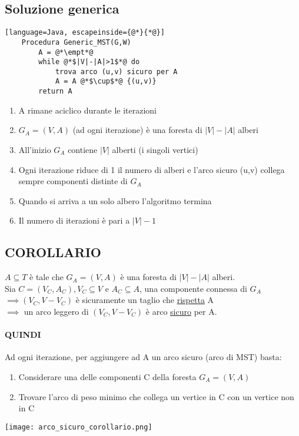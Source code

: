 \subsection{Soluzione generica}
\begin{lstlisting}[language=Java, escapeinside={@*}{*@}]
    Procedura Generic_MST(G,W)
        A = @*\empt*@
        while @*$|V|-|A|>1$*@ do
            trova arco (u,v) sicuro per A
            A = A @*$\cup$*@ {(u,v)}
        return A
\end{lstlisting}
\begin{enumerate}
    \item A rimane aciclico durante le iterazioni
    \item $G_A = (V,A)$ (ad ogni iterazione) è una foresta di $|V|-|A|$ alberi
    \item All'inizio $G_A$ contiene $|V|$ alberti (i singoli vertici)
    \item Ogni iterazione riduce di 1 il numero di alberi e l'arco sicuro (u,v) collega
    sempre componenti distinte di $G_A$
    \item Quando si arriva a un solo albero l'algoritmo termina
    \item Il numero di iterazioni è pari a $|V|-1$
\end{enumerate}
\subsection{COROLLARIO}
$A\subseteq T$ è tale che $G_A = (V,A)$ è una foresta di $|V|-|A|$ alberi.\\
Sia $C= (V_C, A_C), V_C \subseteq V$ e $A_C \subseteq A$, una componente connessa di $G_A$\\
$\implies (V_C, V-V_C)$ è sicuramente un taglio che \underline{rispetta} A\\
$\implies$ un arco leggero di $(V_C, V-V_C)$ è arco \underline{sicuro} per A.\\
\paragraph*{QUINDI} Ad ogni iterazione, per aggiungere ad A un arco sicuro (arco di MST) basta:
\begin{enumerate}
    \item Considerare una delle componenti C della foresta $G_A = (V,A)$
    \item Trovare l'arco di peso minimo che collega un vertice in C con un vertice non in C
\end{enumerate}
\begin{center}
    \texttt{[image: arco\_sicuro\_corollario.png]}
\end{center}
